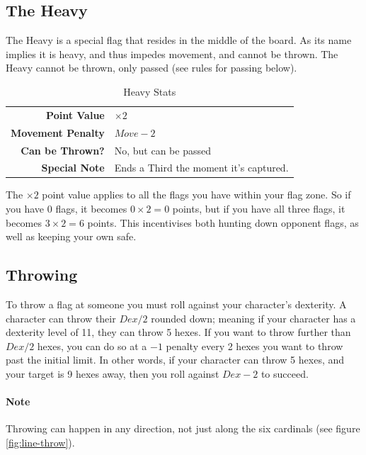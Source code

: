 \subsection{The Heavy}
The Heavy is a special flag that resides in the middle of the board. 
As its name implies it is heavy, and thus impedes movement, and cannot be thrown.
The Heavy cannot be thrown, only passed (see rules for passing below).
\begin{table}[!h]
    \centering
\begin{tabular}{r|l}
    \textbf{Point Value} & $\times 2$ \\
    \textbf{Movement Penalty} & $Move-2$ \\
    \textbf{Can be Thrown?} & No, but can be passed \\
    \textbf{Special Note} & Ends a Third the moment it’s captured. \\
\end{tabular}
    \caption{Heavy Stats}
    \label{tab:heavy}
\end{table}
The $\times 2$ point value applies to all the flags you have within your flag zone. So if you have 0 flags, it becomes $0 \times 2 = 0$ points, but if you have all three flags, it becomes $3 \times 2 = 6$ points. This incentivises both hunting down opponent flags, as well as keeping your own safe.
\subsection{Throwing}
To throw a flag at someone you must roll against your character’s dexterity. 
A character can throw their $Dex / 2$ rounded down; meaning if your character has a dexterity level of 11, they can throw 5 hexes.
If you want to throw further than $Dex/2$ hexes, you can do so at a $-1$ penalty every 2 hexes you want to throw past the initial limit. In other words, if your character can throw 5 hexes, and your target is 9 hexes away, then you roll against $Dex-2$ to succeed.

\paragraph{Note} Throwing can happen in any direction, not just along the six cardinals (see figure \ref{fig:line-throw}).

